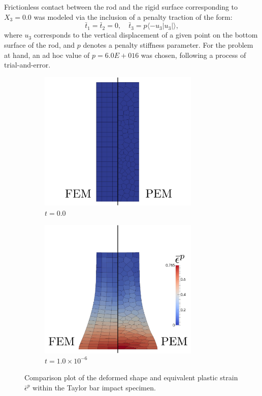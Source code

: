 Frictionless contact between the rod and the rigid surface corresponding to $X_3 = 0.0$ was modeled via the inclusion of a penalty traction of the form:
\begin{equation}
	\bar{t}_1 = \bar{t}_2 = 0, \quad \bar{t}_3 = p \langle -u_3|u_3|  \rangle,
\end{equation}
where $u_3$ corresponds to the vertical displacement of a given point on the bottom surface of the rod, and $p$ denotes a penalty stiffness parameter. For the problem at hand, an ad hoc value of $p = 6.0E+016$ was chosen, following a process of trial-and-error.

\begin{figure}[!h]
  \centering
    \begin{subfigure}[b]{0.49\linewidth}
            \centering
            \includegraphics[width=3.0in]{figures/taylor_eqps_0.pdf}
    			\caption{$t=0.0$ \label{fig:taylor_eqps_0}}
    \end{subfigure}
	\begin{subfigure}[b]{0.49\linewidth}
            \centering
            \includegraphics[width=3.0in]{figures/taylor_eqps_1.pdf}
    			\caption{$t=1.0\times 10^{-6}$ \label{fig:taylor_eqps_1}}
    \end{subfigure} \caption{Comparison plot of the deformed shape and equivalent plastic strain $\bar{\epsilon}^p$ within the Taylor bar impact specimen.}
  \label{fig:taylor_eqps}
\end{figure}

